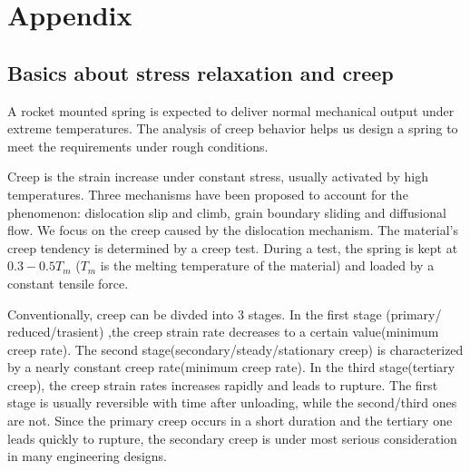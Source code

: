 \documentclass[10pt]{article}
\begin{document}



\section{Appendix}
\label{sec:Appendix}
\subsection{Basics about stress relaxation and creep}
A rocket mounted spring is expected to deliver normal mechanical output under extreme temperatures. The analysis of creep behavior helps us design a spring to meet the requirements under rough conditions.

Creep is the strain increase under constant stress, usually activated by high temperatures. Three mechanisms have been proposed to account for the phenomenon: dislocation slip and climb, grain boundary sliding and diffusional flow. We focus on the creep caused by the dislocation mechanism. The material's creep tendency is determined by a creep test. During a test, the spring is kept at $0.3-0.5T_m$ ($T_m$ is the melting temperature of the material) and loaded by a constant tensile force.

Conventionally, creep can be divded into $3$ stages. In the first stage (primary/ reduced/trasient) ,the creep strain rate decreases to a certain value(minimum creep rate). The second stage(secondary/steady/stationary creep) is characterized by a nearly constant creep rate(minimum creep rate). In the third stage(tertiary creep), the creep strain rates increases rapidly and leads to rupture. The first stage is usually reversible with time after unloading, while the second/third ones are not. Since the primary creep occurs in a short duration and the tertiary one leads quickly to rupture, the secondary creep is under most serious consideration in many engineering designs.
\end{document}
